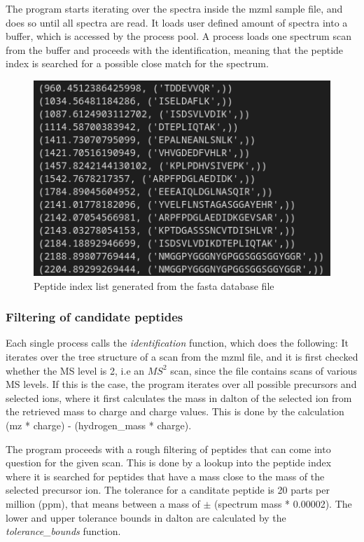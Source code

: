 \documentclass[11pt]{article}
\begin{document}
The program starts iterating over the spectra inside the mzml sample file, and does so until all spectra are read. It loads user defined amount of spectra into a buffer, which is accessed by the process pool. A process loads one spectrum scan from the buffer and proceeds with the identification, meaning that the peptide index is searched for a possible close match for the spectrum.
\begin{figure}
\includegraphics[width=\linewidth]{figs/peptindex.png} 
\caption{Peptide index list generated from the fasta database file}
\label{fig:peptindex}
\end{figure}
\subsubsection{Filtering of candidate peptides}
Each single process calls the \textit{identification} function, which does the following:
It iterates over the tree structure of a scan from the mzml file, and it is first checked whether the MS level is 2, i.e an \(MS^2\) scan, since the file contains scans of various MS levels. If this is the case, the program iterates over all possible precursors and selected ions, where it first calculates the mass in dalton of the selected ion from the retrieved mass to charge and charge values. This is done by the calculation (mz * charge) - (hydrogen\_mass * charge).

The program proceeds with a rough filtering of peptides that can come into question for the given scan. This is done by a lookup into the peptide index where it is searched for peptides that have a mass close to the mass of the selected precursor ion. The tolerance for a canditate peptide is 20 parts per million (ppm), that means between a mass of $\pm$ (spectrum mass * 0.00002). The lower and upper tolerance bounds in dalton are calculated by the \textit{tolerance\_bounds} function. 
\end{document}
